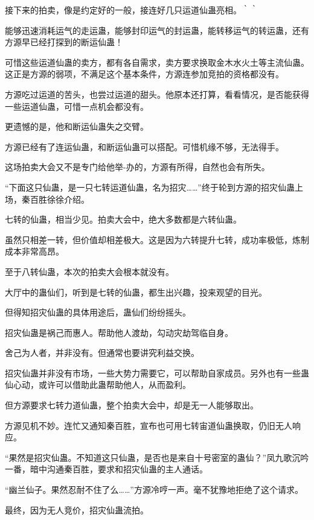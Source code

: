 
\begin{this_body}

接下来的拍卖，像是约定好的一般，接连好几只运道仙蛊亮相。｀｀

能够迅速消耗运气的走运蛊，能够封印运气的封运蛊，能转移运气的转运蛊，还有方源早已经打探到的断运仙蛊！

可惜这些运道仙蛊的卖方，都有各自需求，卖方要求换取金木水火土等主流仙蛊。这正是方源的弱项，不满足这个基本条件，方源连参加竞拍的资格都没有。

方源吃过运道的苦头，也尝过运道的甜头。他原本还打算，看看情况，是否能获得一些运道仙蛊，可惜一点机会都没有。

更遗憾的是，他和断运仙蛊失之交臂。

方源已经有了连运仙蛊，和断运仙蛊可以搭配。可惜机缘不够，无法得手。

这场拍卖大会又不是专门给他举-办的，方源有所得，自然也会有所失。

“下面这只仙蛊，是一只七转运道仙蛊，名为招灾……”终于轮到方源的招灾仙蛊上场，秦百胜徐徐介绍。

七转的仙蛊，相当少见。拍卖大会中，绝大多数都是六转仙蛊。

虽然只相差一转，但价值却相差极大。这是因为六转提升七转，成功率极低，炼制成本非常高昂。

至于八转仙蛊，本次的拍卖大会根本就没有。

大厅中的蛊仙们，听到是七转的仙蛊，都生出兴趣，投来观望的目光。

但得知招灾仙蛊的具体用途后，蛊仙们纷纷摇头。

招灾仙蛊是祸己而惠人。帮助他人渡劫，勾动灾劫驾临自身。

舍己为人者，并非没有。但通常也要讲究利益交换。

招灾仙蛊并非没有市场，一些大势力需要它，可以帮助自家成员。另外也有一些蛊仙心动，或许可以借助此蛊帮助他人，从而盈利。

但方源要求七转力道仙蛊，整个拍卖大会中，却是无一人能够取出。

方源见机不妙。连忙又通知秦百胜，宣布也可用七转宙道仙蛊换取，仍旧无人响应。

“果然是招灾仙蛊。不知道这只仙蛊，是否也是来自十号密室的蛊仙？”凤九歌沉吟一番，暗中沟通秦百胜，要求和招灾仙蛊的主人通话。

“幽兰仙子。果然忍耐不住了么……”方源冷哼一声。毫不犹豫地拒绝了这个请求。

最终，因为无人竞价，招灾仙蛊流拍。


\end{this_body}
